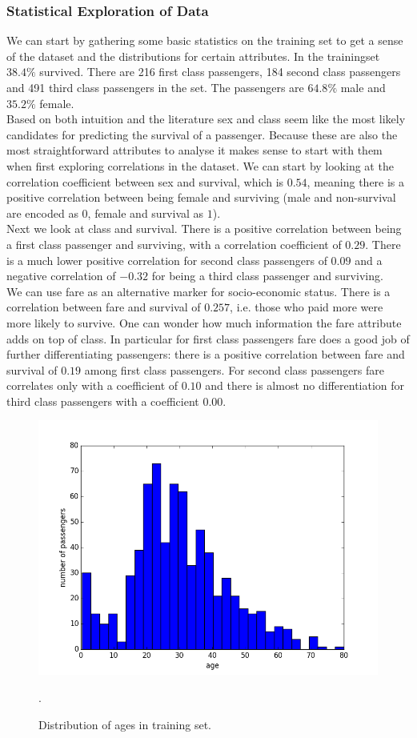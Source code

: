 \documentclass[english, a4paper]{article}
\begin{document}
\subsubsection{Statistical Exploration of Data}
We can start by gathering some basic statistics on the training set to get a sense of the dataset and the distributions for certain attributes. In the trainingset $38.4\%$ survived. There are 216 first class passengers, 184 second class passengers and 491 third class passengers in the set. The passengers are $64.8\%$ male and $35.2\%$ female.\\
Based on both intuition and the literature sex and class seem like the most likely candidates for predicting the survival of a passenger. Because these are also the most straightforward attributes to analyse it makes sense to start with them when first exploring correlations in the dataset. We can start by looking at the correlation coefficient between sex and survival, which is $0.54$, meaning there is a positive correlation between being female and surviving (male and non-survival are encoded as $0$, female and survival as $1$).\\
Next we look at class and survival. There is a positive correlation between being a first class passenger and surviving, with a correlation coefficient of $0.29$. There is a much lower positive correlation for second class passengers of $0.09$ and a negative correlation of $-0.32$ for being a third class passenger and surviving.\\
We can use fare as an alternative marker for socio-economic status. There is a correlation between fare and survival of $0.257$, i.e. those who paid more were more likely to survive. One can wonder how much information the fare attribute adds on top of class. In particular for first class passengers fare does a good job of further differentiating passengers: there is a positive correlation between fare and survival of $0.19$ among first class passengers. For second class passengers fare correlates only with a coefficient of $0.10$ and there is almost no differentiation for third class passengers with a coefficient $0.00$.
\begin{figure}[H]
    \includegraphics[width=0.7\linewidth]{age_distribution}
    \caption{Distribution of ages in training set.}
    \label{fig:age_histogram}.
\end{figure}
\end{document}
